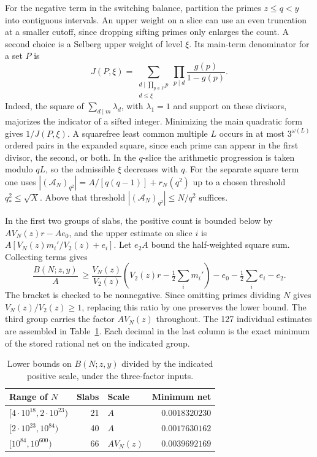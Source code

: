 \documentclass[11pt]{article}
\theoremstyle{remark}\newtheorem{remark}[theorem]{Remark}
\begin{document}
For the negative term in the switching balance, partition the primes $z\le q<y$ into contiguous intervals. An upper weight on a slice can use an even truncation at a smaller cutoff, since dropping sifting primes only enlarges the count. A second choice is a Selberg upper weight of level $\xi$. Its main-term denominator for a set $P$ is
\[
 J(P,\xi)=\sum_{\substack{d\mid\prod_{p\in P}p\\ d\le\xi}}
              \prod_{p\mid d}\frac{g(p)}{1-g(p)}.
\]
Indeed, the square of $\sum_{d\mid m}\lambda_d$, with $\lambda_1=1$ and support on these divisors, majorizes the indicator of a sifted integer. Minimizing the main quadratic form gives $1/J(P,\xi)$. A squarefree least common multiple $L$ occurs in at most $3^{\omega(L)}$ ordered pairs in the expanded square, since each prime can appear in the first divisor, the second, or both. In the $q$-slice the arithmetic progression is taken modulo $qL$, so the admissible $\xi$ decreases with $q$. For the separate square term one uses $|(\mathcal A_N)_{q^2}|=A/[q(q-1)]+r_N(q^2)$ up to a chosen threshold $q_*^2\le\sqrt X$. Above that threshold $|(\mathcal A_N)_{q^2}|\le N/q^2$ suffices.

In the first two groups of slabs, the positive count is bounded below by $A V_N(z)r-Ae_0$, and the upper estimate on slice $i$ is $A[V_N(z)m_i'/V_2(z)+e_i]$. Let $e_2 A$ bound the half-weighted square sum. Collecting terms gives
\[
 \frac{B(N;z,y)}{A}\ \ge \frac{V_N(z)}{V_2(z)}
 \left(V_2(z)r-\tfrac12\sum_i m_i'\right)
 -e_0-\tfrac12\sum_i e_i-e_2 .
\]
The bracket is checked to be nonnegative. Since omitting primes dividing $N$ gives $V_N(z)/V_2(z)\ge1$, replacing this ratio by one preserves the lower bound. The third group carries the factor $AV_N(z)$ throughout. The 127 individual estimates are assembled in Table~\ref{tab:k3list}. Each decimal in the last column is the exact minimum of the stored rational net on the indicated group.

\begin{table}[htbp]
\centering
\begin{tabular}{@{}lrlr@{}}
\hline
Range of $N$ & Slabs & Scale & Minimum net \\
\hline
$[4\cdot10^{18},2\cdot10^{23})$ & 21 & $A$ & $0.0018320230$ \\
$[2\cdot10^{23},10^{84})$       & 40 & $A$ & $0.0017630162$ \\
$[10^{84},10^{600})$            & 66 & $AV_N(z)$ & $0.0039692169$ \\
\hline
\end{tabular}
\caption{Lower bounds on $B(N;z,y)$ divided by the indicated positive scale, under the three-factor inputs.}\label{tab:k3list}
\end{table}
\end{document}
